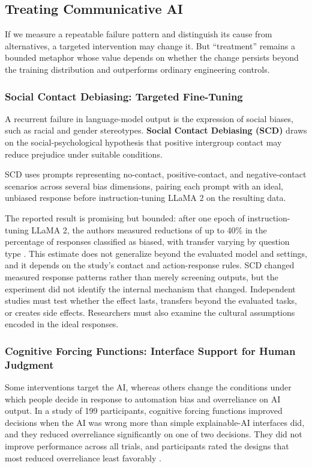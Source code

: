 \documentclass{article}
\begin{document}
\subsection{Treating Communicative AI}
If we measure a repeatable failure pattern and distinguish its cause from alternatives, a targeted intervention may change it. But ``treatment'' remains a bounded metaphor whose value depends on whether the change persists beyond the training distribution and outperforms ordinary engineering controls.

\subsubsection{Social Contact Debiasing: Targeted Fine-Tuning}
A recurrent failure in language-model output is the expression of social biases, such as racial and gender stereotypes. \textbf{Social Contact Debiasing (SCD)} \citep{ref33} draws on the social-psychological hypothesis that positive intergroup contact may reduce prejudice under suitable conditions.

SCD uses prompts representing no-contact, positive-contact, and negative-contact scenarios across several bias dimensions, pairing each prompt with an ideal, unbiased response before instruction-tuning LLaMA 2 on the resulting data.

The reported result is promising but bounded: after one epoch of instruction-tuning LLaMA 2, the authors measured reductions of up to 40\% in the percentage of responses classified as biased, with transfer varying by question type \citep{ref33}. This estimate does not generalize beyond the evaluated model and settings, and it depends on the study's contact and action-response rules. SCD changed measured response patterns rather than merely screening outputs, but the experiment did not identify the internal mechanism that changed. Independent studies must test whether the effect lasts, transfers beyond the evaluated tasks, or creates side effects. Researchers must also examine the cultural assumptions encoded in the ideal responses.

\subsubsection{Cognitive Forcing Functions: Interface Support for Human Judgment}
Some interventions target the AI, whereas others change the conditions under which people decide in response to automation bias and overreliance on AI output. In a study of 199 participants, cognitive forcing functions improved decisions when the AI was wrong more than simple explainable-AI interfaces did, and they reduced overreliance significantly on one of two decisions. They did not improve performance across all trials, and participants rated the designs that most reduced overreliance least favorably \citep{ref71}.
\end{document}
